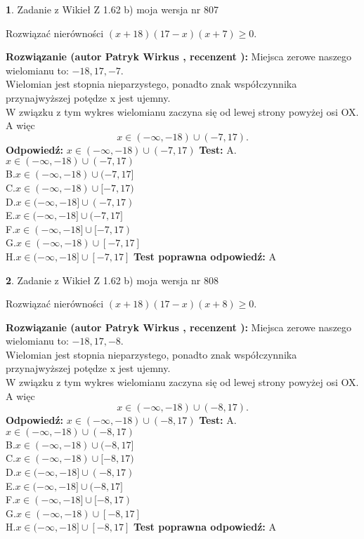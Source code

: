 \documentclass[12pt, a4paper]{article}
\theoremstyle{definition} %
\newtheorem{zad}{}
\newcommand{\zadStart}[1]{\begin{zad}#1\newline}
\newcommand{\zadStop}{\end{zad}}
\newcommand{\rozwStart}[2]{\noindent \textbf{Rozwiązanie (autor #1 , recenzent #2): }\newline}
\newcommand{\rozwStop}{\newline}
\newcommand{\odpStart}{\noindent \textbf{Odpowiedź:}\newline}
\newcommand{\odpStop}{\newline}
\newcommand{\testStart}{\noindent \textbf{Test:}\newline}
\newcommand{\testStop}{\newline}
\newcommand{\kluczStart}{\noindent \textbf{Test poprawna odpowiedź:}\newline}
\newcommand{\kluczStop}{\newline}
\begin{document}
\zadStart{Zadanie z Wikieł Z 1.62 b) moja wersja nr 807}

Rozwiązać nierówności $(x+18)(17-x)(x+7)\ge0$.
\zadStop
\rozwStart{Patryk Wirkus}{}
Miejsca zerowe naszego wielomianu to: $-18, 17, -7$.\\
Wielomian jest stopnia nieparzystego, ponadto znak współczynnika przy\linebreak najwyższej potędze x jest ujemny.\\ W związku z tym wykres wielomianu zaczyna się od lewej strony powyżej osi OX. A więc $$x \in (-\infty,-18) \cup (-7,17).$$
\rozwStop
\odpStart
$x \in (-\infty,-18) \cup (-7,17)$
\odpStop
\testStart
A.$x \in (-\infty,-18) \cup (-7,17)$\\
B.$x \in (-\infty,-18) \cup (-7,17]$\\
C.$x \in (-\infty,-18) \cup [-7,17)$\\
D.$x \in (-\infty,-18] \cup (-7,17)$\\
E.$x \in (-\infty,-18] \cup (-7,17]$\\
F.$x \in (-\infty,-18] \cup [-7,17)$\\
G.$x \in (-\infty,-18) \cup [-7,17]$\\
H.$x \in (-\infty,-18] \cup [-7,17]$
\testStop
\kluczStart
A
\kluczStop



\zadStart{Zadanie z Wikieł Z 1.62 b) moja wersja nr 808}

Rozwiązać nierówności $(x+18)(17-x)(x+8)\ge0$.
\zadStop
\rozwStart{Patryk Wirkus}{}
Miejsca zerowe naszego wielomianu to: $-18, 17, -8$.\\
Wielomian jest stopnia nieparzystego, ponadto znak współczynnika przy\linebreak najwyższej potędze x jest ujemny.\\ W związku z tym wykres wielomianu zaczyna się od lewej strony powyżej osi OX. A więc $$x \in (-\infty,-18) \cup (-8,17).$$
\rozwStop
\odpStart
$x \in (-\infty,-18) \cup (-8,17)$
\odpStop
\testStart
A.$x \in (-\infty,-18) \cup (-8,17)$\\
B.$x \in (-\infty,-18) \cup (-8,17]$\\
C.$x \in (-\infty,-18) \cup [-8,17)$\\
D.$x \in (-\infty,-18] \cup (-8,17)$\\
E.$x \in (-\infty,-18] \cup (-8,17]$\\
F.$x \in (-\infty,-18] \cup [-8,17)$\\
G.$x \in (-\infty,-18) \cup [-8,17]$\\
H.$x \in (-\infty,-18] \cup [-8,17]$
\testStop
\kluczStart
A
\kluczStop
\end{document}
